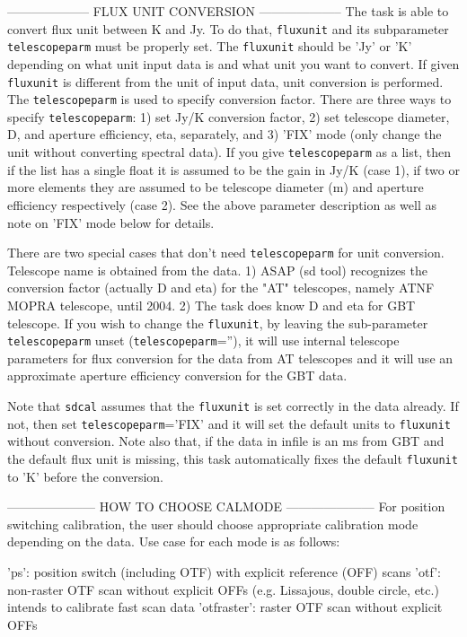 --------------------
FLUX UNIT CONVERSION
--------------------
The task is able to convert flux unit between K and Jy. To do that,
{\tt fluxunit} and its subparameter {\tt telescopeparm} must be properly set.
The {\tt fluxunit} should be 'Jy' or 'K' depending on what unit input
data is and what unit you want to convert. If given {\tt fluxunit} is
different from the unit of input data, unit conversion is performed.
The {\tt telescopeparm} is used to specify conversion factor. There are
three ways to specify {\tt telescopeparm}: 1) set Jy/K conversion factor,
2) set telescope diameter, D, and aperture efficiency, eta,
separately, and 3) 'FIX' mode (only change the unit without
converting spectral data). If you give {\tt telescopeparm} as a list,
then if the list has a single float it is assumed to be the gain
in Jy/K (case 1), if two or more elements they are assumed to be
telescope diameter (m) and aperture efficiency respectively
(case 2).
See the above parameter description as well as note on 'FIX' mode
below for details.
  
There are two special cases that don't need {\tt telescopeparm} for unit
conversion. Telescope name is obtained from the data.
1) ASAP (sd tool) recognizes the conversion factor (actually D and
   eta) for the "AT" telescopes, namely ATNF MOPRA telescope, until
   2004.
2) The task does know D and eta for GBT telescope.
If you wish to change the {\tt fluxunit}, by leaving the sub-parameter
{\tt telescopeparm} unset ({\tt telescopeparm}=''), it will use internal
telescope parameters for flux conversion for the data from AT
telescopes and it will use an approximate aperture efficiency
conversion for the GBT data.

Note that {\tt sdcal} assumes that the {\tt fluxunit} is set correctly in
the data already. If not, then set {\tt telescopeparm}='FIX' and it
will set the default units to {\tt fluxunit} without conversion.
Note also that, if the data in infile is an ms from GBT and the
default flux unit is missing, this task automatically fixes the
default {\tt fluxunit} to 'K' before the conversion.

---------------------
HOW TO CHOOSE CALMODE
---------------------
For position switching calibration, the user should choose
appropriate calibration mode depending on the data. Use case
for each mode is as follows:

    'ps': position switch (including OTF) with explicit
          reference (OFF) scans
    'otf': non-raster OTF scan without explicit OFFs
           (e.g. Lissajous, double circle, etc.)
           intends to calibrate fast scan data
    'otfraster': raster OTF scan without explicit OFFs

